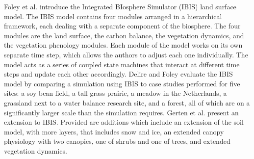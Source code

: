 Foley et al. \cite{Foley-IntegratedBiosphere} introduce the Integrated BIosphere Simulator (IBIS) land surface model. The IBIS model contains four modules arranged in a hierarchical framework, each dealing with a separate component of the biosphere. The four modules are the land surface, the carbon balance, the vegetation dynamics, and the vegetation phenology modules. Each module of the model works on its own separate time step, which allows the authors to adjust each one individually. The model acts as a series of coupled state machines that interact at different time steps and update each other accordingly.
% 
% 
Delire and Foley \cite{Delire-EvaluatingPerformance} evaluate the IBIS model by comparing a simulation using IBIS to case studies performed for five sites: a soy bean field, a tall grass prairie, a meadow in the Netherlands, a grassland next to a water balance research site, and a forest, all of which are on a significantly larger scale than the simulation requires. 
% 
Gerten et al. \cite{Dieter-TerrestrialVegetation} present an extension to IBIS. Provided are additions which include an extension of the soil model, with more layers, that includes snow and ice, an extended canopy physiology with two canopies, one of shrubs and one of trees, and extended vegetation dynamics.

